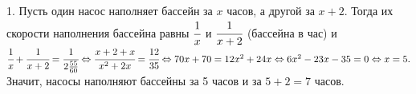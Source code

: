 1. Пусть один насос наполняет бассейн за $x$ часов, а другой за $x+2.$ Тогда их скорости наполнения бассейна равны $\cfrac{1}{x}$ и $\cfrac{1}{x+2}$ (бассейна в час) и $\cfrac{1}{x}+\cfrac{1}{x+2}=\cfrac{1}{2\frac{55}{60}}\Leftrightarrow \cfrac{x+2+x}{x^2+2x}=\cfrac{12}{35}\Leftrightarrow
70x+70=12x^2+24x\Leftrightarrow6x^2-23x-35=0\Leftrightarrow x=5.$ Значит, насосы наполняют бассейны за 5 часов и за $5+2=7$ часов.\\

